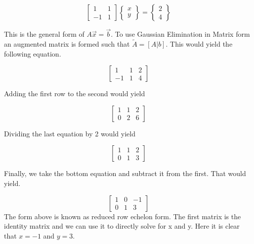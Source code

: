 \begin{enumerate}
\begin{equation}
\begin{bmatrix} 1 & 1 \\ -1 & 1 \end{bmatrix}
\begin{Bmatrix} x \\ y \end{Bmatrix} = 
\begin{Bmatrix} 2 \\ 4 \end{Bmatrix}
\end{equation}

This is the general form of $A\vec{x} = \vec{b}$. To use Gaussian
Elimination in Matrix form an augmented matrix is formed such that
$\tilde{A} = [A|b]$. This would yield the following equation.

\begin{equation}
\begin{bmatrix}
1 & 1 & 2 \\
-1 & 1 & 4
\end{bmatrix}
\end{equation}

Adding the first row to the second would yield

\begin{equation}
\begin{bmatrix}
1 & 1 & 2 \\
0 & 2 & 6
\end{bmatrix}
\end{equation}

Dividing the last equation by 2 would yield

\begin{equation}
\begin{bmatrix}
1 & 1 & 2 \\
0 & 1 & 3
\end{bmatrix}
\end{equation}

Finally, we take the bottom equation and subtract it from the
first. That would yield.

\begin{equation}
\begin{bmatrix}
1 & 0 & -1 \\
0 & 1 & 3
\end{bmatrix}
\end{equation}
The form above is known as reduced row echelon form. The first matrix
is the identity matrix and we can use it to directly solve for x and
y. Here it is clear that $x = -1$ and $y = 3$. 


\end{enumerate}
